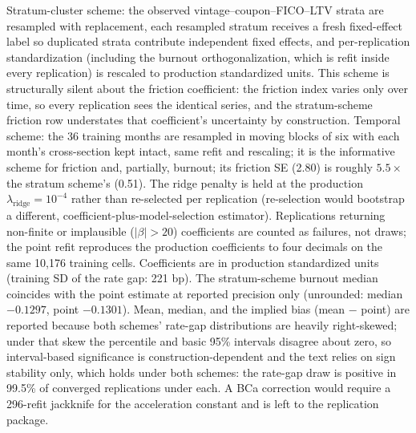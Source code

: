 \documentclass[12pt]{article}
\begin{document}
\begin{table}[H]
\begin{threeparttable}
\begin{tablenotes}[flushleft]
\item Stratum-cluster scheme: the observed vintage--coupon--FICO--LTV strata are resampled with replacement, each resampled stratum receives a fresh fixed-effect label so duplicated strata contribute independent fixed effects, and per-replication standardization (including the burnout orthogonalization, which is refit inside every replication) is rescaled to production standardized units. This scheme is structurally silent about the friction coefficient: the friction index varies only over time, so every replication sees the identical series, and the stratum-scheme friction row understates that coefficient's uncertainty by construction. Temporal scheme: the 36 training months are resampled in moving blocks of six with each month's cross-section kept intact, same refit and rescaling; it is the informative scheme for friction and, partially, burnout; its friction SE (2.80) is roughly $5.5\times$ the stratum scheme's (0.51). The ridge penalty is held at the production $\lambda_{\mathrm{ridge}} = 10^{-4}$ rather than re-selected per replication (re-selection would bootstrap a different, coefficient-plus-model-selection estimator). Replications returning non-finite or implausible ($|\beta| > 20$) coefficients are counted as failures, not draws; the point refit reproduces the production coefficients to four decimals on the same 10,176 training cells. Coefficients are in production standardized units (training SD of the rate gap: 221 bp). The stratum-scheme burnout median coincides with the point estimate at reported precision only (unrounded: median $-0.1297$, point $-0.1301$). Mean, median, and the implied bias (mean $-$ point) are reported because both schemes' rate-gap distributions are heavily right-skewed; under that skew the percentile and basic 95\% intervals disagree about zero, so interval-based significance is construction-dependent and the text relies on sign stability only, which holds under both schemes: the rate-gap draw is positive in 99.5\% of converged replications under each. A BCa correction would require a 296-refit jackknife for the acceleration constant and is left to the replication package.
\end{tablenotes}
\end{threeparttable}
\end{table}
\end{document}
